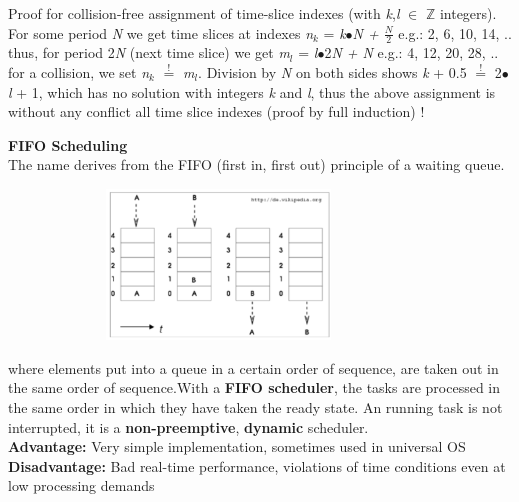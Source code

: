 Proof for collision-free assignment of time-slice indexes  (with \textit{k},\textit{l} $\in$ \textbf{$\boldsymbol{\mathbb{Z}}$}  integers). For some period \textit{N} we get time slices at indexes  \textit{n${}_{k}$}  =  \textit{k$\bullet$N  +  $\frac{N}{2} $}  e.g.: 2, 6, 10, 14, ..\\

thus, for period 2\textit{N} (next time slice) we get    \textit{m${}_{l}$} =  \textit{l$\bullet$}2\textit{N  +  N  }e.g.: 4, 12, 20, 28, ..\\

for a collision, we set \textit{n${}_{k}$} ${\mathop{=}\limits^{!}} $ \textit{m${}_{l}$}. Division by \textit{N} on both sides shows \textit{k} + 0.5 ${\mathop{=}\limits^{!}} $ 2$\mathrm{\bullet}$\textit{l} + 1, which has no solution with integers \textit{k} and \textit{l}, thus the above assignment is without any conflict all time slice indexes (proof by full induction) !\\
\newpage

{\rot\bf FIFO Scheduling}\\

The name derives from the FIFO (first in, first out) principle of a waiting queue.

 	\begin{figure}[h]
    \centering
    \includegraphics[width=9cm, height=4cm]{Images/image97.png}
    \label{fig:Fig 42}
    \end{figure}

where elements put into a queue in a certain order of sequence, are taken out in the same order of sequence.With a \textbf{FIFO scheduler}, the tasks are processed in the same order in which they have taken the ready state. An running task is not interrupted, it is a \textbf{non-preemptive}, \textbf{dynamic} scheduler.\\

\textbf{Advantage:}   Very simple implementation, sometimes used in universal OS\\
\textbf{Disadvantage:}  Bad real-time performance, violations of time conditions even at low processing demands\\

